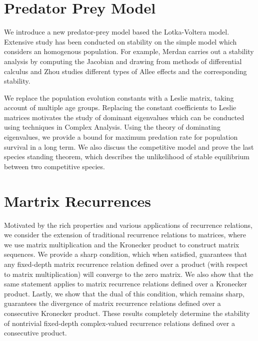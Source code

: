 \documentclass{article}
\begin{document}
\section{Predator Prey Model}


We introduce a new predator-prey model based 
the Lotka-Voltera model. Extensive study has been conducted 
on stability on the simple model which 
considers an homogenous population. For example, Merdan \cite{MeD09, Mer10}carries 
out a stability analysis by computing the Jacobian and 
drawing from methods of differential calculus and Zhou \cite{ZhL05} studies different types of Allee effects and 
the corresponding stability. 

We replace the population evolution constants 
with a Leslie matrix, taking account of multiple age groups. 
Replacing the constant coefficients to 
Leslie matrices motivates the study of dominant eigenvalues 
which can be conducted using techniques in Complex Analysis. 
Using the theory of dominating eigenvalues, we provide a bound 
for maximum predation rate for population survival in a long term. 
We also discuss the competitive model and prove the 
last species standing theorem, which describes the unlikelihood 
of stable equilibrium between two competitive species. 



\section{Martrix Recurrences}

Motivated by the rich properties and various applications of recurrence relations, we consider the extension of traditional recurrence relations to matrices, where we use matrix multiplication and the Kronecker product to construct matrix sequences. We provide a sharp condition, which when satisfied, guarantees that any fixed-depth matrix recurrence relation defined over a product (with respect to matrix multiplication) will converge to the zero matrix. We also show that the same statement applies to matrix recurrence relations defined over a Kronecker product. Lastly, we show that the dual of this condition, which remains sharp, guarantees the divergence of matrix recurrence relations defined over a consecutive Kronecker product. These results completely determine the stability of nontrivial fixed-depth complex-valued recurrence relations defined over a consecutive product.
\end{document}
